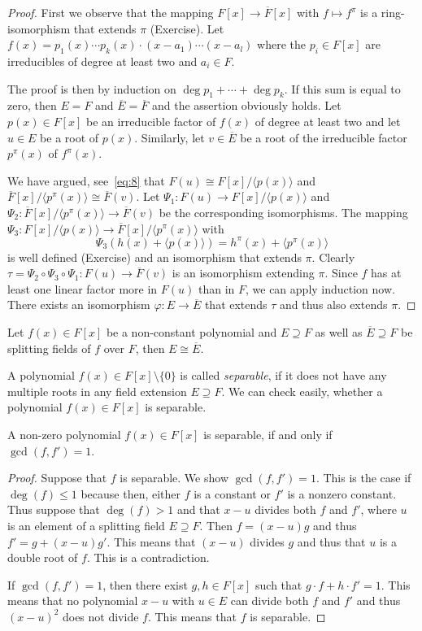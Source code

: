 \begin{proof}
  First we observe that the mapping $ F[x] → \overline{F}[x]$ with $f ↦ f^π$ is a ring-isomorphism that extends $π$ (Exercise).
  Let $f(x) = p_1(x) \cdots p_k(x) ⋅ (x-a_1) \cdots (x-a_l)$ where the $p_i∈ F[x]$ are irreducibles of degree at least two and $a_i ∈F$. 
  
  The proof is then by induction on $\deg p_1 + \cdots + \deg p_k$. If this sum is equal to zero,  then $E = F$ and $\overline{E} = \overline{F}$ and the assertion obviously holds. Let $p(x)∈ F[x]$  be an irreducible factor of $f(x)$ of degree at least two and let $u ∈ E$ be a root of $p(x)$. Similarly, let $v ∈ \overline{E}$ be a root of the irreducible factor $p^π(x)$ of $f^π(x)$.

  We have argued, see~\eqref{eq:8} that $F(u) ≅ F[x] / 〈 p(x) 〉$ and $\overline{F}[x] / 〈p^π(x)〉 ≅ \overline{F}(v)$. Let $Ψ_1: F(u) → F[x] / 〈 p(x) 〉$ and $Ψ_2: \overline{F}[x] / 〈p^π(x)〉 →  \overline{F}(v)$ be the corresponding isomorphisms.   The  mapping  $Ψ_3: F[x] / 〈p(x)〉 → \overline{F}[x] / 〈p^π(x) 〉$ with 
  \begin{equation}
    \label{eq:11}
    Ψ_3 (h(x) + 〈p(x) 〉 ) = h^π(x) + 〈p^π(x)〉
  \end{equation}
  is well defined (Exercise) 
  and an isomorphism that extends $π$. Clearly $ τ = Ψ_2 \circ  Ψ_3 \circ Ψ_1: F(u) → \overline{F}(v)$ is an isomorphism extending $π$. Since $f$ has at least one linear factor more in $F(u)$ than in $F$, we can apply induction now. There exists an isomorphism $φ: E → \overline{E}$ that extends $τ$ and thus also extends $π$.       
\end{proof}


\begin{corollary}
  \label{co:1}
  Let $f(x) ∈ F[x]$ be a non-constant polynomial and $E ⊇F$ as well as $\overline{E} ⊇F$ be splitting fields of $f$ over $F$, then $E ≅ \overline{E}$. 
\end{corollary}

A polynomial $f(x) ∈ F[x] \setminus\{0\}$ is called \emph{separable}, if it does not have any multiple roots in any field extension $E ⊇F$. We can check easily, whether a polynomial $f(x) ∈F[x]$ is separable. 
\begin{theorem}
  \label{thr:14}
  A non-zero polynomial $f(x) ∈ F[x]$ is separable, if and only if $\gcd(f,f') = 1$. 
\end{theorem}

\begin{proof}
  Suppose that $f$ is separable. We show $\gcd(f,f') = 1$. This is the case if $\deg(f)≤1$ because then, either $f$ is a constant or $f'$ is a nonzero constant.   Thus suppose that $\deg(f)>1$ and that  $x-u$ divides both $f$ and $f'$, where $u$ is an element of a splitting field $E ⊇ F$. Then $f = (x-u) g$  and thus $f'= g + (x-u) g'$. This means that $(x-u)$ divides $g$ and thus that $u$ is a double root of $f$. This is a contradiction. 

  If $\gcd(f,f') = 1$, then there exist $g,h∈ F[x]$ such that $g ⋅ f + h ⋅f'=1$. This means that no polynomial $x-u$ with $u ∈E$ can divide both $f$ and $f'$ and thus $(x-u)^2$ does not divide $f$. This means that  $f$ is separable.
\end{proof}

